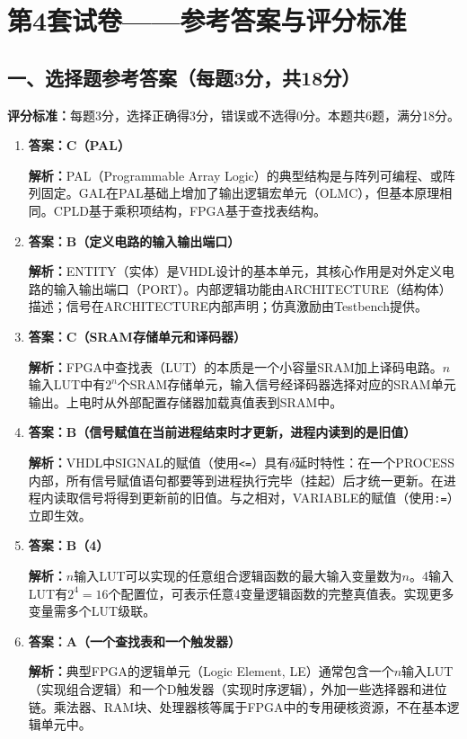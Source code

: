 \chapter{第4套试卷——参考答案与评分标准}

\usetikzlibrary{automata, positioning, arrows}

\section*{一、选择题参考答案（每题3分，共18分）}

\begin{framed}
\textbf{评分标准：}每题3分，选择正确得3分，错误或不选得0分。本题共6题，满分18分。
\end{framed}

\begin{enumerate}[label=\arabic*.]
\item \textbf{答案：C（PAL）}

\textbf{解析：}PAL（Programmable Array Logic）的典型结构是与阵列可编程、或阵列固定。GAL在PAL基础上增加了输出逻辑宏单元（OLMC），但基本原理相同。CPLD基于乘积项结构，FPGA基于查找表结构。

\item \textbf{答案：B（定义电路的输入输出端口）}

\textbf{解析：}ENTITY（实体）是VHDL设计的基本单元，其核心作用是对外定义电路的输入输出端口（PORT）。内部逻辑功能由ARCHITECTURE（结构体）描述；信号在ARCHITECTURE内部声明；仿真激励由Testbench提供。

\item \textbf{答案：C（SRAM存储单元和译码器）}

\textbf{解析：}FPGA中查找表（LUT）的本质是一个小容量SRAM加上译码电路。$n$输入LUT中有$2^n$个SRAM存储单元，输入信号经译码器选择对应的SRAM单元输出。上电时从外部配置存储器加载真值表到SRAM中。

\item \textbf{答案：B（信号赋值在当前进程结束时才更新，进程内读到的是旧值）}

\textbf{解析：}VHDL中SIGNAL的赋值（使用\texttt{<=}）具有$\delta$延时特性：在一个PROCESS内部，所有信号赋值语句都要等到进程执行完毕（挂起）后才统一更新。在进程内读取信号将得到更新前的旧值。与之相对，VARIABLE的赋值（使用\texttt{:=}）立即生效。

\item \textbf{答案：B（4）}

\textbf{解析：}$n$输入LUT可以实现的任意组合逻辑函数的最大输入变量数为$n$。4输入LUT有$2^4=16$个配置位，可表示任意4变量逻辑函数的完整真值表。实现更多变量需多个LUT级联。

\item \textbf{答案：A（一个查找表和一个触发器）}

\textbf{解析：}典型FPGA的逻辑单元（Logic Element, LE）通常包含一个$n$输入LUT（实现组合逻辑）和一个D触发器（实现时序逻辑），外加一些选择器和进位链。乘法器、RAM块、处理器核等属于FPGA中的专用硬核资源，不在基本逻辑单元中。

\end{enumerate}


